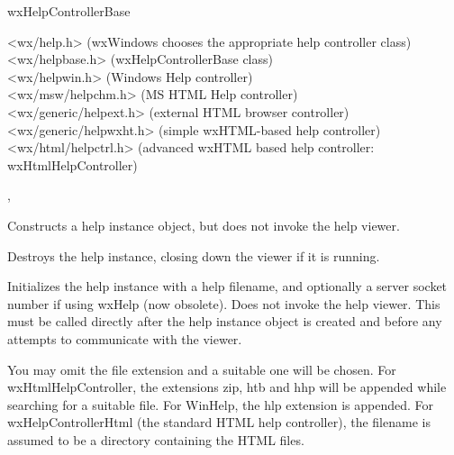 
wxHelpControllerBase\\


<wx/help.h> (wxWindows chooses the appropriate help controller class)\\
<wx/helpbase.h> (wxHelpControllerBase class)\\
<wx/helpwin.h> (Windows Help controller)\\
<wx/msw/helpchm.h> (MS HTML Help controller)\\
<wx/generic/helpext.h> (external HTML browser controller)\\
<wx/generic/helpwxht.h> (simple wxHTML-based help controller)\\
<wx/html/helpctrl.h> (advanced wxHTML based help controller: wxHtmlHelpController)


, 




Constructs a help instance object, but does not invoke the help viewer.



Destroys the help instance, closing down the viewer if it is running.

\label{wxhelpcontrollerinitialize}



Initializes the help instance with a help filename, and optionally a server socket
number if using wxHelp (now obsolete). Does not invoke the help viewer.
This must be called directly after the help instance object is created and before
any attempts to communicate with the viewer.

You may omit the file extension and a suitable one will be chosen. For
wxHtmlHelpController, the extensions zip, htb and hhp will be appended while searching for
a suitable file. For WinHelp, the hlp extension is appended. For wxHelpControllerHtml (the
standard HTML help controller), the filename is assumed to be a directory containing
the HTML files.

